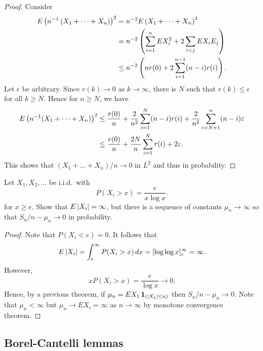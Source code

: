 \documentclass[a4paper]{article}
\begin{document}
\begin{proof}
  Consider
  \begin{align*}
    E \left( n^{-1} \left( X_1 + \dots + X_n \right) \right)^2
     & = n^{-2} E \left( X_1 + \dots + X_n \right)^2                      \\
     & = n^{-2} \left( \sum_{i=1}^n E X_i^2 + 2 \sum_{i < j} E X_i E_j \right) \\
     & \leq n^{-2} \left( n r(0) + 2 \sum_{i=1}^{n - 1} (n - i) r(i) \right).
  \end{align*}
  Let $\epsilon$ be arbitrary.
  Since $r(k) \to 0$ as $k \to \infty$, there is $N$ such that
  $r(k) \leq \epsilon$ for all $k \geq N$. Hence for $n \geq N$, we have
  \begin{align*}
    E \left( n^{-1} (X_1 + \dots + X_n) \right)^2
     & \leq \frac{r(0)}{n} + \frac{2}{n^2} \sum_{i=1}^N (n - i) r(i)
    + \frac{2}{n^2} \sum_{i = N + 1}^n (n - i) \varepsilon         \\
     & \leq \frac{r(0)}{n} + \frac{2 N}{n} \sum_{i=1}^N r(i)
    + 2 \varepsilon.
  \end{align*}
  This shows that $(X_1 + \dots + X_n) / n \to 0$ in $L^2$ and thus
  in probability.

\end{proof}

\begin{ex}[Durrett 2.2.5]
  Let $X_1, X_2, \dots$ be i.i.d.\ with
  \[
    P(X_i > x) = \frac{e}{x \log x}.
  \]
  for $x \geq e$.
  Show that $E \left\lvert X_i\right\rvert = \infty$, but there is a sequence of constants
  $\mu_n \to \infty$ so that $S_n / n - \mu_n \to 0$ in probability.
\end{ex}

\begin{proof}
  Note that $P(X_i < e) = 0$. It follows that
  \[
    E \left\lvert X_i\right\rvert
    = \int_e^\infty P(X_i > x) \, d x
      = [\log \log x]_e^\infty
    = \infty.
  \]
  However,
  \[
    x P(X_i > x) = \frac{e}{\log x} \to 0.
  \]
  Hence, by a previous theorem, if $\mu_n = E X_1 \operatorname{\mathbf{1}}_{(\left\lvert X_1\right\rvert \leq n)}$
  then $S_n / n - \mu_n \to 0$. Note that $\mu_n < \infty$ but
  $\mu_n \to E X_i = \infty$ as $n \to \infty$
  by monotone convergence theorem.

\end{proof}

\subsection{Borel-Cantelli lemmas}
\end{document}
